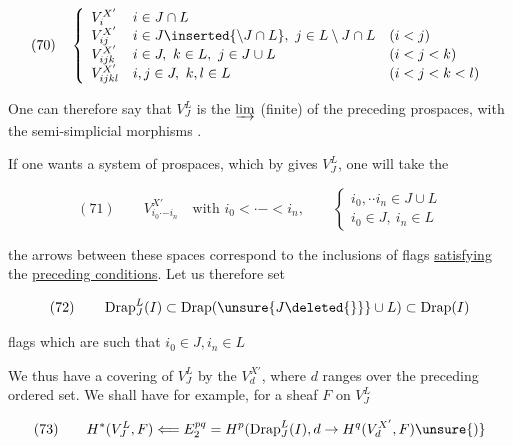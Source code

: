 
\[
(70)\quad\left\{\begin{array}{lll}
V_i^{X'}&i\in J\cap L&\\
V_{ij}^{X'}&i\in J\inserted{\setminus J\cap L},\ j\in L\setminus J\cap L&(i<j)\\
V_{ijk}^{X'}&i\in J,\ k\in L,\ j\in J\cup L&(i<j<k)\\
V_{ijkl}^{X'}&i,j\in J,\ k,l\in L&(i<j<k<l)
\end{array}\right.
\]


One can therefore say that $V_J^L$ is the $\varinjlim$ (finite) of the preceding prospaces, with  the semi-simplicial morphisms  .

If one wants a  system of prospaces,  which by  \inserted{$\unsure{\varinjlim|\underline{\lim}}$} gives $V_J^L$, one will take the

\[
(71)\qquad V_{i_0\mathord{\cdot}\mathord{-}i_n}^{X'}\quad\text{with }i_0<\mathord{\cdot}\mathord{-}<i_n,\qquad
\left\{\begin{array}{l}
i_0,\mathord{\cdot}\mathord{\cdot}i_n\in J\cup L\\
i_0\in J,\ i_n\in L
\end{array}\right.
\]

the arrows between these spaces correspond to the inclusions of flags \uline{satisfying} the \uline{preceding conditions}. Let us therefore set

\[
(72)\qquad\operatorname{Drap}_J^L(I)\subset\operatorname{Drap}(\unsure{J\deleted{\}}}\cup L)\subset\operatorname{Drap}(I)
\]

flags  which are such that $i_0\in J,i_n\in L$

We thus have a covering of $V_J^L$ by the $V_d^{X'}$, where $d$ ranges over the preceding ordered set. We shall have for example, for a sheaf $F$ on $V_J^L$

\[
(73)\qquad H^*(V_J^L,F)\Longleftarrow E_2^{pq}=H^p(\operatorname{Drap}_J^L(I),d\to H^q(V_d^{X'},F)\unsure{)}
\]

